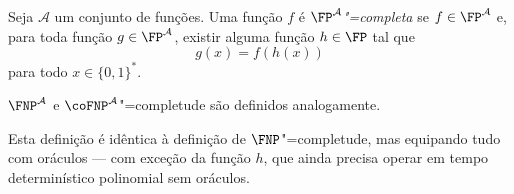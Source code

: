 \begin{definition}
    Seja $\mathcal A$ um conjunto de funções.
    Uma função $f$ é \emph{$\FP^\mathcal A$"=completa}
    se $f \in \FP^\mathcal A$ e,
    para toda função $g \in \FP^\mathcal A$,
    existir alguma função $h \in \FP$ tal que
    \begin{equation*}
        g(x) = f(h(x))
    \end{equation*}
    para todo $x \in \{0, 1\}^*$.

    $\FNP^\mathcal A$ e $\coFNP^\mathcal A$"=completude
    são definidos analogamente.
\end{definition}

Esta definição é idêntica à definição de $\FNP$"=completude,
mas equipando tudo com oráculos
--- com exceção da função $h$,
que ainda precisa operar em tempo determinístico polinomial sem oráculos.
